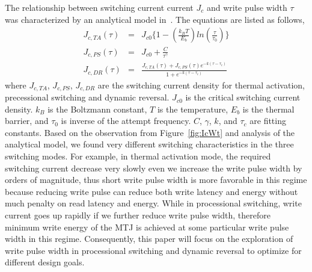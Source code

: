 The relationship between switching current current $J_{c}$ and write pulse width $\tau$ was characterized by an analytical model in~\cite{STTRAM:IEDM09}. The equations are listed as follows,
\begin{eqnarray}
J_{c,TA}(\tau) &=& J_{c0}\{1- (\frac{k_{B}T}{E_{b}})ln(\frac{\tau}{\tau_{0}})\} \label{eqn:jcta} \\
J_{c,PS}(\tau) &=& J_{c0}+ \frac{C}{\tau^{\gamma}} \label{eqn:jcps} \\
J_{c,DR}(\tau) &=& \frac{J_{c,TA}(\tau)+J_{c,PS}(\tau)e^{-k(\tau - \tau_{c})}}{1+e^{-k(\tau - \tau_{c})}} \label{eqn:jcdr}
\end{eqnarray}
where $J_{c,TA}$, $J_{c,PS}$, $J_{c,DR}$ are the switching current density for thermal activation, precessional switching and dynamic reversal. $J_{c0}$ is the critical switching current density. $k_{B}$ is the Boltzmann constant, $T$ is the temperature, $E_{b}$ is the thermal barrier, and $\tau_{0}$ is inverse of the attempt frequency. $C$, $\gamma$, $k$, and $\tau_{c}$ are fitting constants. Based on the observation from Figure~\ref{fig:IcWt} and analysis of the analytical model,  we found very different switching characteristics in the three switching modes. For example, in thermal activation mode, the required switching current decrease very slowly even we increase the write pulse width by orders of magnitude, thus short write pulse width is more favorable in this regime because reducing write pulse can reduce both write latency and energy without much penalty on read latency and energy. While in processional switching, write current goes up rapidly if we further reduce write pulse width, therefore minimum write energy of the MTJ is achieved at some particular write pulse width in this regime. Consequently, this paper will focus on the exploration of write pulse width in processional switching and dynamic reversal to optimize for different design goals.

